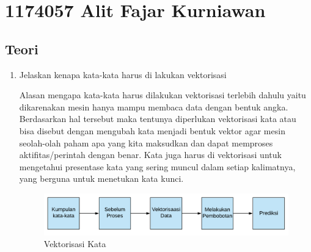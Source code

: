 \section{1174057 Alit Fajar Kurniawan}
    \subsection{Teori}
   		\begin{enumerate}
   			\item Jelaskan kenapa kata-kata harus di lakukan vektorisasi
   			\par Alasan mengapa kata-kata harus dilakukan vektorisasi terlebih dahulu yaitu dikarenakan mesin hanya mampu membaca data dengan bentuk angka. Berdasarkan hal tersebut maka tentunya diperlukan vektorisasi kata atau bisa disebut dengan mengubah kata menjadi bentuk vektor agar mesin seolah-olah paham apa yang kita maksudkan dan dapat memproses aktiﬁtas/perintah dengan benar. Kata juga harus di vektorisasi untuk mengetahui presentase kata yang sering muncul dalam setiap kalimatnya, yang berguna untuk menetukan kata kunci. 
   			\begin{figure}[H]
				\centering
				\includegraphics[scale=0.5]{figures/1174057/chapter5/1.png}
				\caption{Vektorisasi Kata}
				\label{Vektorisasi Kata}
			\end{figure}


\end{enumerate}
